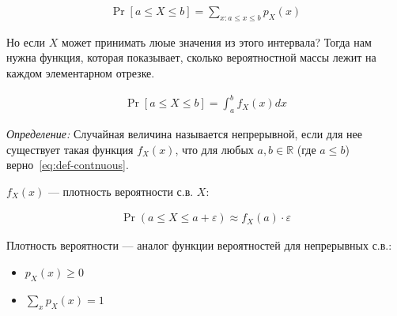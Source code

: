 \documentclass[12pt]{article}
\newcommand\R{\mathbb{R}}
\newcommand\eps{\varepsilon}
\begin{document}
  \begin{align*}
      \Pr[a \le X \le b] = \sum_{x: a \le x \le b} p_X(x)
  \end{align*}

  Но если $X$ может принимать люые значения из этого интервала? Тогда нам нужна функция, которая показывает, сколько вероятностной массы лежит на каждом элементарном отрезке.

  \begin{center}
  \end{center}

  \begin{align}\label{eq:def-contnuous}
      \Pr[a \le X \le b] = \int_a^b f_X(x) dx 
  \end{align}

  \emph{Определение:} Случайная величина называется непрерывной, если для нее существует такая функция $f_X(x)$, что для любых $a, b \in \R$ (где $a \le b$) верно~\eqref{eq:def-contnuous}.

  $f_X(x)$ --- плотность вероятности с.в. $X$:

  \begin{align*}
      \Pr(a \le X \le a + \eps) \approx f_X(a) \cdot \varepsilon 
  \end{align*}

  Плотность вероятности --- аналог функции вероятностей для непрерывных с.в.:

  \begin{itemize}
      \item $p_X(x) \ge 0$
      \item $\sum_x p_X(x) = 1$
  \end{itemize}
\end{document}
